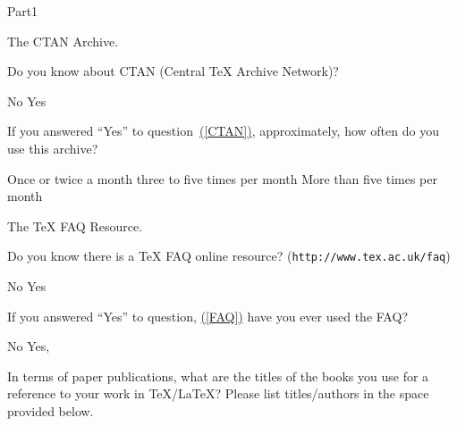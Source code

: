 \documentclass{article}
\begin{document}
\begin{exam}{Part1}
\begin{problem*}
The \textsf{CTAN} Archive.
\begin{parts}
\item\label{CTAN} Do you know about \textsf{CTAN} (Central {\TeX} Archive Network)?
  \begin{answers}{4}
    \bChoices
         No\eAns
         Yes\eAns
    \eChoices
  \end{answers}

\item If you answered ``Yes'' to question~\hyperref[CTAN]{(\ref*{CTAN})}, approximately, how often
      do you use this archive?
  \begin{answers}{3}
    \bChoices
         Once or twice a month\eAns
         three to five times per month\eAns
         More than five times per month\eAns
    \eChoices
  \end{answers}

\end{parts}
\end{problem*}

\begin{problem*}
The {\TeX} \textsf{FAQ} Resource.
\begin{parts}
\item\label{FAQ} Do you know there is a {\TeX} \textsf{FAQ} online resource? (\texttt{http://www.tex.ac.uk/faq})
  \begin{answers}{4}
    \bChoices
         No\eAns
         Yes\eAns
    \eChoices
  \end{answers}

\item\label{FAQ1} If you answered ``Yes'' to question, \hyperref[FAQ]{(\ref*{FAQ})} have you ever used the \textsf{FAQ}?
  \begin{answers}{4}
    \bChoices
         No\eAns
         Yes, \eAns
    \eChoices
  \end{answers}
\end{parts}
\end{problem*}

\begin{problem}
In terms of paper publications, what are the titles of the books you use for a reference to your
work in \TeX/\LaTeX? Please list titles/authors in the space provided below.
\begin{solution}[1.8in]
\end{solution}
\end{problem}


\end{exam}
\end{document}
